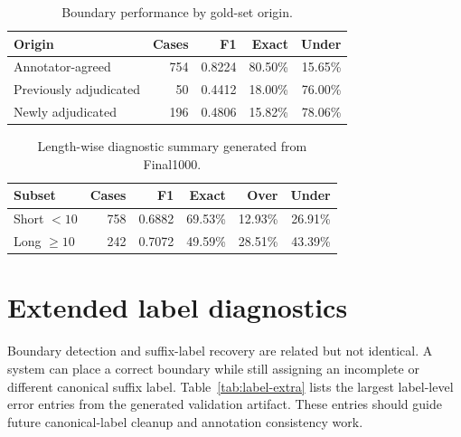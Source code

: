 \documentclass[11pt]{article}
\begin{document}
\begin{table}[h]
\centering
\caption{Boundary performance by gold-set origin.}
\label{tab:origin-extra}
\begin{tabular}{lrrrr}
\toprule
Origin & Cases & F1 & Exact & Under \\
\midrule
Annotator-agreed & 754 & 0.8224 & 80.50\% & 15.65\% \\
Previously adjudicated & 50 & 0.4412 & 18.00\% & 76.00\% \\
Newly adjudicated & 196 & 0.4806 & 15.82\% & 78.06\% \\
\bottomrule
\end{tabular}
\end{table}

\begin{table}[h]
\centering
\caption{Length-wise diagnostic summary generated from Final1000.}
\label{tab:length-extra}
\begin{tabular}{lrrrrr}
\toprule
Subset & Cases & F1 & Exact & Over & Under \\
\midrule
Short $<10$ & 758 & 0.6882 & 69.53\% & 12.93\% & 26.91\% \\
Long $\geq10$ & 242 & 0.7072 & 49.59\% & 28.51\% & 43.39\% \\
\bottomrule
\end{tabular}
\end{table}

\section{Extended label diagnostics}
Boundary detection and suffix-label recovery are related but not identical. A system can place a correct boundary while still assigning an incomplete or different canonical suffix label. Table~\ref{tab:label-extra} lists the largest label-level error entries from the generated validation artifact. These entries should guide future canonical-label cleanup and annotation consistency work.
\end{document}
